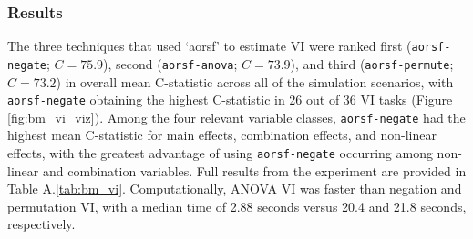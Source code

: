 \documentclass{article}\usepackage[]{graphicx}\usepackage[]{xcolor}
\newcommand{\tabrefAppendix}[1]{Table A.\ref{#1}}
\begin{document}
\subsubsection{Results} \label{sec:results_vi}



The three techniques that used `aorsf' to estimate VI were ranked first (\texttt{aorsf-negate}; $C = 75.9$), second (\texttt{aorsf-anova}; $C = 73.9$), and third (\texttt{aorsf-permute}; $C = 73.2$) in overall mean C-statistic across all of the simulation scenarios, with \texttt{aorsf-negate} obtaining the highest C-statistic in 26 out of 36 VI tasks (Figure \ref{fig:bm_vi_viz}). Among the four relevant variable classes, \texttt{aorsf-negate} had the highest mean C-statistic for main effects, combination effects, and non-linear effects, with the greatest advantage of using \texttt{aorsf-negate} occurring among non-linear and combination variables. Full results from the experiment are provided in \tabrefAppendix{tab:bm_vi}. Computationally, ANOVA VI was faster than negation and permutation VI, with a median time of 2.88 seconds versus 20.4 and 21.8 seconds, respectively.
\end{document}
